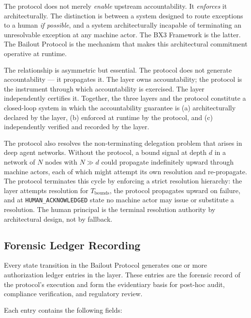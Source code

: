 The protocol does not merely \textit{enable} upstream accountability. It \textit{enforces} it architecturally. The distinction is between a system designed to route exceptions to a human \textit{if possible}, and a system architecturally incapable of terminating an unresolvable exception at any machine actor. The BX3 Framework is the latter. The Bailout Protocol is the mechanism that makes this architectural commitment operative at runtime.

The relationship is asymmetric but essential. The protocol does not generate accountability — it propagates it. The \purpose{} layer owns accountability; the protocol is the instrument through which accountability is exercised. The \fact{} layer independently certifies it. Together, the three layers and the protocol constitute a closed-loop system in which the accountability guarantee is (a) architecturally declared by the \purpose{} layer, (b) enforced at runtime by the protocol, and (c) independently verified and recorded by the \fact{} layer.

The protocol also resolves the non-terminating delegation problem that arises in deep agent networks. Without the protocol, a bound signal at depth $d$ in a network of $N$ nodes with $N \gg d$ could propagate indefinitely upward through machine actors, each of which might attempt its own resolution and re-propagate. The protocol terminates this cycle by enforcing a strict resolution hierarchy: the \bounds{} layer attempts resolution for $T_{\text{bounds}}$, the protocol propagates upward on failure, and at \texttt{HUMAN\_ACKNOWLEDGED} state no machine actor may issue or substitute a resolution. The human principal is the terminal resolution authority by architectural design, not by fallback.

\subsection{Forensic Ledger Recording}
\label{sec:forensic-ledger}

Every state transition in the Bailout Protocol generates one or more authorization ledger entries in the \fact{} layer. These entries are the forensic record of the protocol's execution and form the evidentiary basis for post-hoc audit, compliance verification, and regulatory review.

Each entry contains the following fields:

